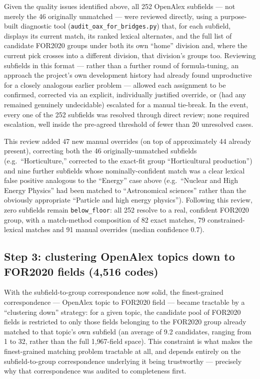 \documentclass[11pt]{article}
\begin{document}
Given the quality issues identified above, all 252 OpenAlex subfields --- not merely the
46 originally unmatched --- were reviewed directly, using a purpose-built diagnostic
tool (\texttt{audit\_oax\_for\_bridges.py}) that, for each subfield, displays its current
match, its ranked lexical alternates, and the full list of candidate FOR2020 groups
under both its own ``home'' division and, where the current pick crosses into a
different division, that division's groups too. Reviewing subfields in this format ---
rather than a further round of formula-tuning, an approach the project's own development
history had already found unproductive for a closely analogous earlier problem ---
allowed each assignment to be confirmed, corrected via an explicit, individually
justified override, or (had any remained genuinely undecidable) escalated for a manual
tie-break. In the event, every one of the 252 subfields was resolved through direct
review; none required escalation, well inside the pre-agreed threshold of fewer than 20
unresolved cases.

This review added 47 new manual overrides (on top of approximately 44 already present),
correcting both the 46 originally-unmatched subfields (e.g.\ ``Horticulture,'' corrected
to the exact-fit group ``Horticultural production'') and nine further subfields whose
nominally-confident match was a clear lexical false positive analogous to the ``Energy''
case above (e.g.\ ``Nuclear and High Energy Physics'' had been matched to ``Astronomical
sciences'' rather than the obviously appropriate ``Particle and high energy physics'').
Following this review, zero subfields remain \texttt{below\_floor}: all 252 resolve to a
real, confident FOR2020 group, with a match-method composition of 82 exact matches, 79
constrained-lexical matches and 91 manual overrides (median confidence 0.7).

\subsection{Step 3: clustering OpenAlex topics down to FOR2020 fields (4,516 codes)}

With the subfield-to-group correspondence now solid, the finest-grained correspondence
--- OpenAlex topic to FOR2020 field --- became tractable by a ``clustering down''
strategy: for a given topic, the candidate pool of FOR2020 fields is restricted to only
those fields belonging to the FOR2020 group already matched to that topic's own
subfield (an average of 9.2 candidates, ranging from 1 to 32, rather than the full
1{,}967-field space). This constraint is what makes the finest-grained matching problem
tractable at all, and depends entirely on the subfield-to-group correspondence
underlying it being trustworthy --- precisely why that correspondence was audited to
completeness first.
\end{document}
